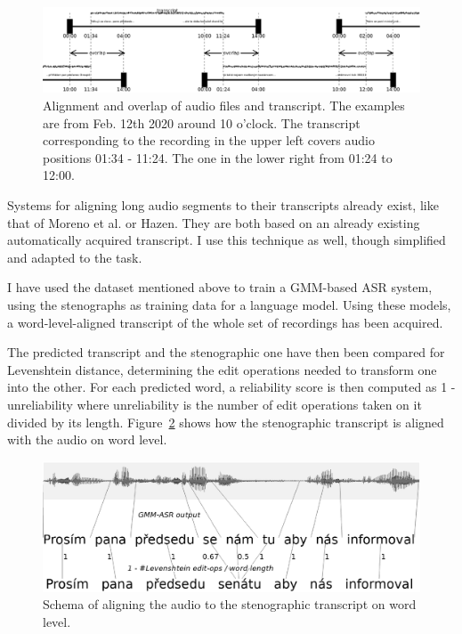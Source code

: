 \documentclass[conference]{IEEEtran}
\begin{document}
\begin{figure}[tpb]
\centering
\includegraphics[width=0.9\hsize]{rc/overlap.eps}
\caption{Alignment and overlap of audio files and transcript. The examples are
from Feb. 12th 2020 around 10 o'clock. The transcript corresponding to the
recording in the upper left covers audio positions 01:34 - 11:24. The one in the
lower right from 01:24 to 12:00.}
\label{fig:overlap}
\end{figure}


Systems for aligning long audio segments to their transcripts already exist,
like that of Moreno et al.\cite{moreno1998recursive} or
Hazen\cite{hazen2006automatic}. They are both based on an already existing
automatically acquired transcript. I use this technique as well, though 
simplified and adapted to the task.

I have used the dataset mentioned above\cite{pspdata} to train a GMM-based ASR
system, using the stenographs as training data for a language model. Using these
models, a word-level-aligned transcript of the whole set of recordings has been
acquired.

The predicted transcript and the stenographic one have then been compared for
Levenshtein distance, determining the edit operations needed to transform one
into the other. For each predicted word, a reliability score is then
computed as 1 - unreliability where unreliability is the number of edit
operations taken on it divided by its length.
Figure~\ref{fig:align} shows how the stenographic transcript is aligned with the
audio on word level.

\begin{figure}[htpb]
\includegraphics[width=0.9\hsize]{rc/align.eps}
\caption{Schema of aligning the audio to the stenographic transcript on word
level.}
\label{fig:align}
\end{figure}
\end{document}

